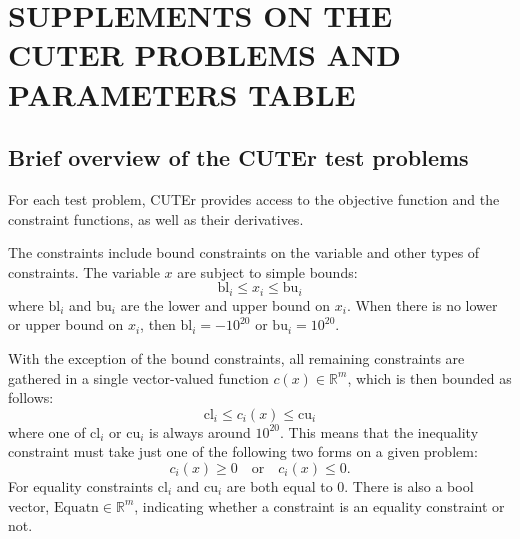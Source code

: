  
\appendix    %


\chapter{SUPPLEMENTS ON THE CUTER PROBLEMS AND PARAMETERS TABLE}

\section{Brief overview of the CUTEr test problems}\label{sec:cuternm}
For each test problem, CUTEr provides access to the objective function and the constraint functions, as well as their derivatives.

The constraints include bound constraints on the variable and other types of constraints. The variable $x$ are subject to simple bounds:
\begin{equation*}
\text{bl}_i \leq x_i \leq \text{bu}_i  
\end{equation*}
where $\text{bl}_i$ and $\text{bu}_i$ are the lower and upper bound on $x_i$. When there is no lower or upper bound on $x_i$, then $\text{bl}_i = -10^{20}$ or $\text{bu}_i = 10^{20}$. 

With the exception of the bound constraints, all remaining 
constraints are gathered in a single vector-valued function $c(x) \in \mathbb{R}^m$, which is then bounded as follows:   
\begin{equation*}
\text{cl}_i \leq c_i(x) \leq \text{cu}_i  
\end{equation*}
where one of $\text{cl}_i$ or $\text{cu}_i$ is always around $10^{20}$. This means that the inequality constraint must take just one of 
the following two forms on a given problem:
\begin{equation*}
c_i(x) \geq 0   \quad  \text{or}  \quad  c_i(x) \leq 0.
\end{equation*}
For equality constraints $\text{cl}_i$ and $\text{cu}_i$ are both equal to 0. There is also a bool vector, $\text{Equatn} \in \mathbb{R}^m$, indicating whether a constraint is an equality constraint or not. 

